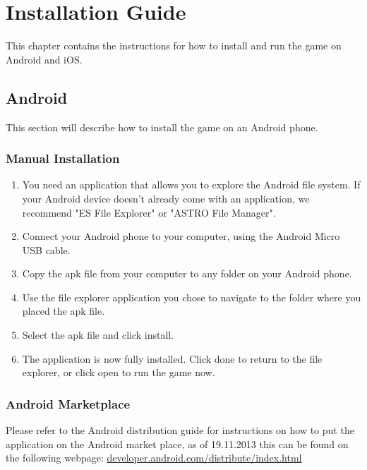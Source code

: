 \chapter{Installation Guide}

This chapter contains the instructions for how to install and run the game on 
Android and iOS.

\section{Android}

This section will describe how to install the game on an Android phone.

\subsection*{Manual Installation}
\begin{enumerate}

	\item{} You need an application that allows you to explore the Android file
	system. If your Android device doesn't already come with an application, 
	we recommend "ES File Explorer" or "ASTRO File Manager".

	\item{} Connect your Android phone to your computer, using the Android Micro
	USB cable.

	\item{} Copy the apk file from your computer to any folder on your Android 
	phone.

	\item{} Use the file explorer application you chose to navigate to the folder 
	where you placed the apk file.

	\item{} Select the apk file and click install.

	\item{} The application is now fully installed. Click done to return to the 
	file explorer, or click open to run the game now.

\end{enumerate}

\subsection*{Android Marketplace}
Please refer to the Android distribution guide for instructions on how to put 
the application on the Android market place, as of 19.11.2013 this can be found 
on the following webpage: \href{http://developer.android.com/distribute/index.html}{developer.android.com/distribute/index.html}

